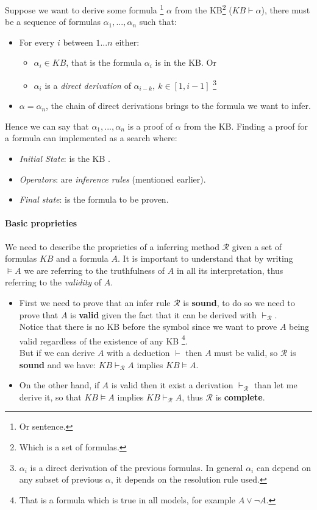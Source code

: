 \documentclass[10pt,a4paper]{article}
\begin{document}
Suppose we want to derive some formula \footnote{Or sentence.} $\alpha$ from the KB\footnote{Which is a set of formulas.} ($KB \vdash \alpha$), there must be a sequence of formulas $\alpha_1,...,\alpha_n$ such that:
\begin{itemize}
\item For every $i$ between $1...n$ either:
	\begin{itemize}
	\item $\alpha_i\in KB$, that is the formula $\alpha_i$ is in the KB. Or
	\item  $\alpha_i$ is a \textit{direct derivation} of $\alpha_{i-k},\ k\in [1,i-1]$ \footnote{$\alpha_i$  is a direct derivation of the previous formulas. In general $\alpha_i$ can depend on any subset of previous $\alpha$, it depends on the resolution rule used. }
	\end{itemize}
\item $\alpha=\alpha_n$, the chain of direct derivations brings to the formula we want to infer.
\end{itemize} 
Hence we can say that $\alpha_1,...,\alpha_n$ is a proof of $\alpha$ from the KB.
Finding a proof for a formula can implemented as a search where:
\begin{itemize}
\item \textit{Initial State}: is the KB  .
\item \textit{Operators}: are \textit{inference rules} (mentioned earlier).
\item \textit{Final state}: is the formula to be proven.

\end{itemize}



\paragraph{Basic proprieties}
We need to describe the proprieties of a inferring method $\mathcal{R}$ given a set of formulas $KB$ and a formula $A$. It is important to understand that by writing $\models A$ we are referring to the truthfulness of $A$ in all its interpretation, thus referring to the \textit{validity} of $A$.
\begin{itemize}
\item First we need to prove that an infer rule $\mathcal{R}$ is \textbf{sound}, to do so we need to prove that $A$ is \textbf{valid} given the fact that it can be derived with $\vdash_{\mathcal{R}}$.\\ 
Notice that there is no KB before the symbol since we want to prove $A$ being valid  regardless of the existence of any KB \footnote{That is a formula which is true in all models, for example $A \vee \neg A$.}.\\
But if we can derive $A$ with a deduction $\vdash$ then $A$ must be valid, so $\mathcal{R}$ is \textbf{sound} and we have: $KB \vdash_{\mathcal{R}} A$ implies $KB \models A$.
\item On the other hand, if $A$ is valid then it exist a derivation $\vdash_{\mathcal{R}} $ than let me derive it, so that $KB \models A$ implies $KB \vdash_{\mathcal{R}} A$, thus  $\mathcal{R}$ is \textbf{complete}.
\end{itemize}
\end{document}
